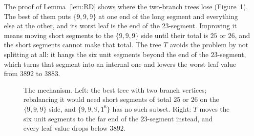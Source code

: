 \documentclass[11pt]{amsart}
\theoremstyle{definition}
\begin{document}
The proof of Lemma~\ref{lem:RD} shows where the two-branch trees lose (Figure~\ref{fig:mech}). The best of them puts $\{9,9,9\}$ at one end of
the long segment and everything else at the other, and its worst leaf is the end of the $23$-segment. Improving it
means moving short segments to the $\{9,9,9\}$ side until their total is $25$ or $26$, and the short segments cannot
make that total. The tree $T$ avoids the problem by not splitting at all: it hangs the six unit segments beyond the end
of the $23$-segment, which turns that segment into an internal one and lowers the worst leaf value from $3892$ to
$3883$.

\begin{figure}[t]
\centering
{}
\caption{The mechanism. Left: the best tree with two branch vertices; rebalancing it would need short segments of
total $25$ or $26$ on the $\{9,9,9\}$ side, and $\{9,9,9,1^6\}$ has no such subset. Right: $T$ moves the six unit
segments to the far end of the $23$-segment instead, and every leaf value drops below $3892$.}
\label{fig:mech}
\end{figure}
\end{document}
